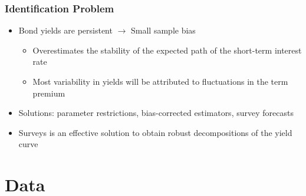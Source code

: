 \documentclass[12pt, aspectratio=169, xcolor=dvipsnames]{beamer} 			         %
\begin{document}
\begin{frame}
	\frametitle{Identification Problem}
	\begin{itemize}
		\item Bond yields are persistent $\rightarrow$ Small sample bias \citep{KimOrphanides:2012}
		\begin{itemize}
			\item Overestimates the stability of the expected path of the short-term interest rate
			\item Most variability in yields will be attributed to fluctuations in the term premium
		\end{itemize}
	\item Solutions: parameter restrictions, bias-corrected estimators, survey forecasts
	\item Surveys is an effective solution to obtain robust decompositions of the yield curve \citep{Guimaraes:2014} 
	\end{itemize}
\end{frame}


\section{Data}
\end{document}
